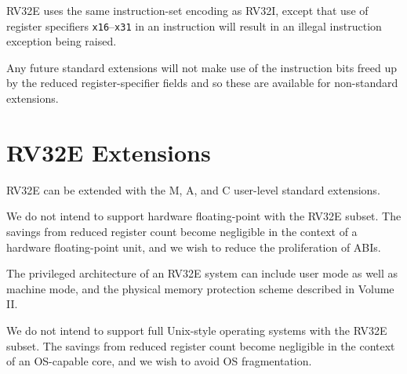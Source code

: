 RV32E uses the same instruction-set encoding as RV32I, except that use
of register specifiers {\tt x16}--{\tt x31} in an instruction will
result in an illegal instruction exception being raised.

\begin{commentary}
Any future standard extensions will not make use of the instruction
bits freed up by the reduced register-specifier fields and so these
are available for non-standard extensions.
\end{commentary}

\section{RV32E Extensions}

RV32E can be extended with the M, A, and C user-level standard extensions.

\begin{commentary}
We do not intend to support hardware floating-point with the RV32E
subset.  The savings from reduced register count become negligible in
the context of a hardware floating-point unit, and we wish to reduce
the proliferation of ABIs.
\end{commentary}

The privileged architecture of an RV32E system can include user mode
as well as machine mode, and the physical memory protection
scheme described in Volume II.

\begin{commentary}
We do not intend to support full Unix-style operating systems with the
RV32E subset.  The savings from reduced register count become
negligible in the context of an OS-capable core, and we wish to avoid
OS fragmentation.
\end{commentary}


